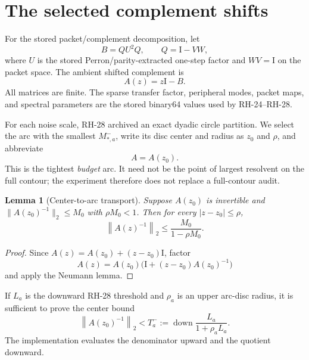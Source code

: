 \documentclass[11pt]{article}
\newtheorem{lemma}[theorem]{Lemma}
\theoremstyle{definition}
\theoremstyle{remark}
\newcommand{\Id}{\mathrm I}
\newcommand{\norm}[1]{\left\lVert#1\right\rVert}
\newcommand{\down}{\operatorname{down}}
\begin{document}
\section{The selected complement shifts}
\label{sec:model}

For the stored packet/complement decomposition, let
\begin{equation}
 B=QU^2Q,\qquad Q=\Id-VW,
 \label{eq:complement-block}
\end{equation}
where $U$ is the stored Perron/parity-extracted one-step factor and $WV=\Id$
on the packet space.  The ambient shifted complement is
\begin{equation}
 A(z)=z\Id-B.
 \label{eq:shifted-complement}
\end{equation}
All matrices are finite.  The sparse transfer factor, peripheral modes,
packet maps, and spectral parameters are the stored binary64 values used by
RH-24--RH-28.

For each noise scale, RH-28 archived an exact dyadic circle partition.  We
select the arc with the smallest $M_{*,a}^-$, write its disc center and radius
as $z_0$ and $\rho$, and abbreviate
\[
 A=A(z_0).
\]
This is the tightest \emph{budget} arc.  It need not be the point of largest
resolvent on the full contour; the experiment therefore does not replace a
full-contour audit.

\begin{lemma}[Center-to-arc transport]
\label{lem:arc-transport}
Suppose $A(z_0)$ is invertible and
$\|A(z_0)^{-1}\|_2\leq M_0$ with $\rho M_0<1$.  Then for every
$|z-z_0|\leq\rho$,
\begin{equation}
 \norm{A(z)^{-1}}_2
 \leq \frac{M_0}{1-\rho M_0}.
 \label{eq:arc-neumann}
\end{equation}
\end{lemma}

\begin{proof}
Since $A(z)=A(z_0)+(z-z_0)\Id$, factor
\[
 A(z)=A(z_0)\bigl(\Id+(z-z_0)A(z_0)^{-1}\bigr)
\]
and apply the Neumann lemma.
\end{proof}

If $L_a$ is the downward RH-28 threshold and $\rho_a$ is an upper arc-disc
radius, it is sufficient to prove the center bound
\begin{equation}
 \norm{A(z_0)^{-1}}_2<T_a^-:=
 \down\frac{L_a}{1+\rho_aL_a}.
 \label{eq:center-budget}
\end{equation}
The implementation evaluates the denominator upward and the quotient
downward.
\end{document}
